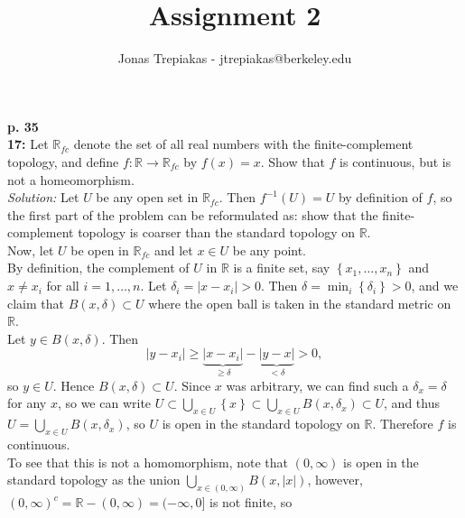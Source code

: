 \documentclass[a4paper]{article}
\title{Assignment 2}
\author{Jonas Trepiakas - jtrepiakas@berkeley.edu}
\date{}
\begin{document}
\maketitle
\newpage
    \textbf{p. 35}\\
    \textbf{17:} Let $\mathbb{R}_{fc}$ denote the set of all real numbers with the
    finite-complement topology, and define $f \colon \mathbb{R} \to
    \mathbb{R}_{fc}$ by
    $f(x) = x$. Show that $f$ is continuous, but is not a homeomorphism.\\
    \linebreak
    \textit{Solution:} Let $U$ be any open set in $\mathbb{R}_{fc}$. Then
    $f^{-1}(U) = U$ by definition of $f$, so the first part of the problem can be reformulated
    as: show that the finite-complement topology is coarser than the standard
    topology on $\mathbb{R}$.\\
    \linebreak
    Now, let $U$ be open in $\mathbb{R}_{fc}$ and let $x \in U$ be any point.\\
    By definition, the complement of $U$ in $\mathbb{R}$ is a finite set, say
    $\left\{ x_1, \ldots, x_n \right\} $ and $x \neq x_i$ for all $i
    = 1,\ldots, n$. Let $\delta_i = \left| x - x_i \right| >0$. Then
    $\delta = \min_{i} \left\{ \delta_i \right\} >0$, and
    we claim that $B(x, \delta) \subset U$ where the open ball is taken in the
    standard metric on $\mathbb{R}$.\\
    \linebreak
    Let $y \in B\left( x, \delta \right) $. Then
    \[
        \left| y- x_i \right| \ge \underbrace{\left| x - x_i \right|}_{
        \ge \delta} - \underbrace{\left| y - x \right|}_{< \delta}
        > 0,
    \] 
    so $ y \in U$. Hence $B\left( x, \delta \right) \subset U$. 
    Since $x$ was arbitrary, we can find such a $\delta_x = \delta$ for any
    $x$, so we can write
    $U \subset \bigcup_{x \in U} \left\{ x \right\} \subset 
    \bigcup_{x \in U} B\left( x, \delta_x \right) 
    \subset U$, and thus $U = \bigcup_{x \in U} B\left( x, \delta_x \right) $,
    so
    $U$ is open in the standard topology on $\mathbb{R}$. Therefore
    $f$ is continuous.\\
    \linebreak
    To see that this is not a homomorphism, note that
    $(0, \infty)$ is open in the standard topology as the union
    $\bigcup_{x \in (0,\infty)} B\left( x, |x| \right) $, however,
    $(0, \infty)^{c} = \mathbb{R} - (0, \infty) = (-\infty, 0]$ is not finite,
    so
\end{document}
